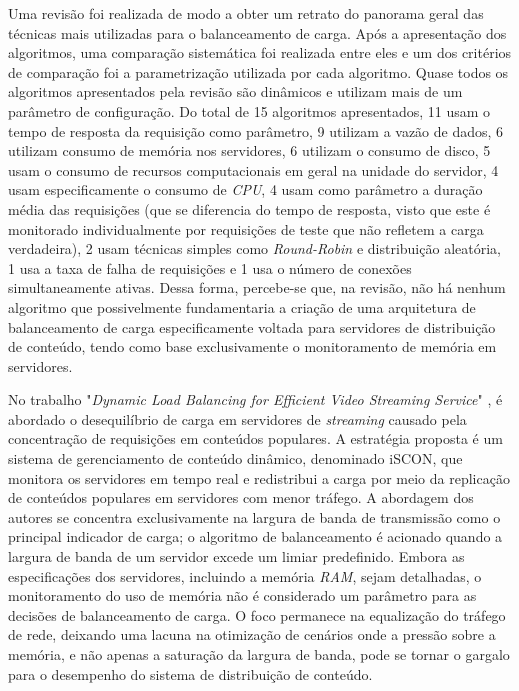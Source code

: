 Uma revisão \cite{webServerPerformanceImprovement2021Review} foi realizada de modo a obter um retrato do panorama geral das técnicas mais utilizadas para o balanceamento de carga. Após a apresentação dos algoritmos, uma comparação sistemática foi realizada entre eles e um dos critérios de comparação foi a parametrização utilizada por cada algoritmo. Quase todos os algoritmos apresentados pela revisão são dinâmicos e utilizam mais de um parâmetro de configuração. Do total de 15 algoritmos apresentados, 11 usam o tempo de resposta da requisição como parâmetro, 9 utilizam a vazão de dados, 6 utilizam consumo de memória nos servidores, 6 utilizam o consumo de disco, 5 usam o consumo de recursos computacionais em geral na unidade do servidor, 4 usam especificamente o consumo de \textit{CPU}, 4 usam como parâmetro a duração média das requisições (que se diferencia do tempo de resposta, visto que este é monitorado individualmente por requisições de teste que não refletem a carga verdadeira), 2 usam técnicas simples como \textit{Round-Robin} e distribuição aleatória, 1 usa a taxa de falha de requisições e 1 usa o número de conexões simultaneamente ativas. Dessa forma, percebe-se que, na revisão, não há nenhum algoritmo que possivelmente fundamentaria a criação de uma arquitetura de balanceamento de carga especificamente voltada para servidores de distribuição de conteúdo, tendo como base exclusivamente o monitoramento de memória em servidores.

No trabalho "\textit{Dynamic Load Balancing for Efficient Video Streaming Service}" \cite{dynamicLoadBalancingForEfficientVideoStreamingService2015}, é abordado o desequilíbrio de carga em servidores de \textit{streaming} causado pela concentração de requisições em conteúdos populares. A estratégia proposta é um sistema de gerenciamento de conteúdo dinâmico, denominado iSCON, que monitora os servidores em tempo real e redistribui a carga por meio da replicação de conteúdos populares em servidores com menor tráfego. A abordagem dos autores se concentra exclusivamente na largura de banda de transmissão como o principal indicador de carga; o algoritmo de balanceamento é acionado quando a largura de banda de um servidor excede um limiar predefinido. Embora as especificações dos servidores, incluindo a memória \textit{RAM}, sejam detalhadas, o monitoramento do uso de memória não é considerado um parâmetro para as decisões de balanceamento de carga. O foco permanece na equalização do tráfego de rede, deixando uma lacuna na otimização de cenários onde a pressão sobre a memória, e não apenas a saturação da largura de banda, pode se tornar o gargalo para o desempenho do sistema de distribuição de conteúdo.

